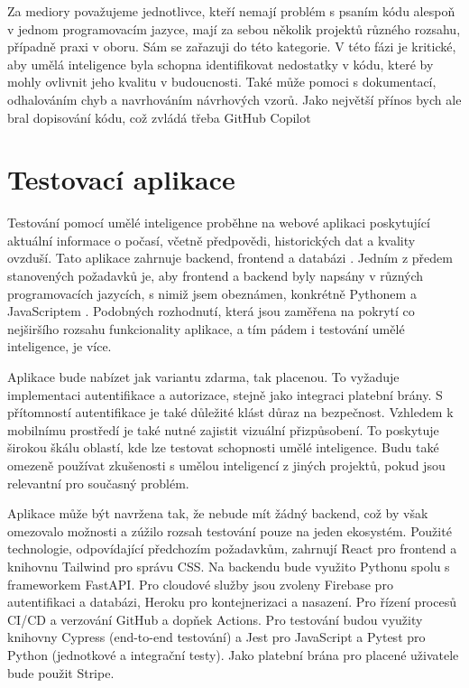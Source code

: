 \documentclass[FM,DP]{tulthesis}
\begin{document}
		Za mediory považujeme jednotlivce, kteří nemají problém s psaním kódu alespoň v jednom programovacím jazyce, mají za sebou několik projektů různého rozsahu, případně praxi v oboru. Sám se zařazuji do této kategorie. V této fázi je kritické, aby umělá inteligence byla schopna identifikovat nedostatky v kódu, které by mohly ovlivnit jeho kvalitu v budoucnosti. Také může pomoci s dokumentací, odhalováním chyb a navrhováním návrhových vzorů. Jako největší přínos bych ale bral dopisování kódu, což zvládá třeba GitHub Copilot \cite{gitCopilot}
		
		\section{Testovací aplikace}
		Testování pomocí umělé inteligence proběhne na webové aplikaci poskytující aktuální informace o počasí, včetně předpovědi, historických dat a kvality ovzduší. Tato aplikace zahrnuje backend, frontend a databázi \cite{webapp_basics}. Jedním z předem stanovených požadavků je, aby frontend a backend byly napsány v různých programovacích jazycích, s nimiž jsem obeznámen, konkrétně Pythonem \cite{python} a JavaScriptem \cite{nodejs}. Podobných rozhodnutí, která jsou zaměřena na pokrytí co nejširšího rozsahu funkcionality aplikace, a tím pádem i testování umělé inteligence, je více.
		
		Aplikace bude nabízet jak variantu zdarma, tak placenou. To vyžaduje implementaci autentifikace a autorizace, stejně jako integraci platební brány. S přítomností autentifikace je také důležité klást důraz na bezpečnost. Vzhledem k mobilnímu prostředí je také nutné zajistit vizuální přizpůsobení. To poskytuje širokou škálu oblastí, kde lze testovat schopnosti umělé inteligence. Budu také omezeně používat zkušenosti s umělou inteligencí z jiných projektů, pokud jsou relevantní pro současný problém.
		
		Aplikace může být navržena tak, že nebude mít žádný backend, což by však omezovalo možnosti a zúžilo rozsah testování pouze na jeden ekosystém. Použité technologie, odpovídající předchozím požadavkům, zahrnují React pro frontend a knihovnu Tailwind pro správu CSS. Na backendu bude využito Pythonu spolu s frameworkem FastAPI. Pro cloudové služby jsou zvoleny Firebase pro autentifikaci a databázi, Heroku pro kontejnerizaci a nasazení. Pro řízení procesů CI/CD a verzování GitHub a dopňek Actions. Pro testování budou využity knihovny Cypress (end-to-end testování) a Jest pro JavaScript a Pytest pro Python (jednotkové a integrační testy). Jako platební brána pro placené uživatele bude použit Stripe.
		
\end{document}
